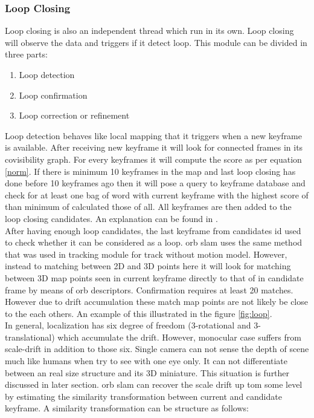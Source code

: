 \subsubsection{Loop Closing} 
Loop closing is also an independent thread which run in its own. Loop closing will observe the data and triggers if it detect loop. This module can be divided in three parts:
\begin{enumerate}
	\item Loop detection
	\item Loop confirmation
	\item Loop correction or refinement
\end{enumerate}
Loop detection behaves like local mapping that it triggers when a new keyframe is available. After receiving new keyframe it will look for connected frames in its covisibility graph.
For every keyframes it will compute the score as per equation \ref{norm}. If there is minimum 10 keyframes in the map and last loop closing has done before 10 keyframes ago then it will pose a query to keyframe database and check for at least one bag of word with current keyframe with the highest score of than minimum of calculated those of all. All keyframes are then added to the loop closing candidates. An explanation can be found in \cite{chris}.\\
\newline
After having enough loop candidates, the last keyframe from candidates id used to check whether it can be considered as a loop. \acrshort{orb} \acrshort{slam} uses the same method that was used in tracking module for track without motion model. However, instead to matching between 2D and 3D points here it will look for matching between 3D map points seen in current keyframe directly to that of in candidate frame by means of \acrshort{orb} descriptors. Confirmation requires at least 20 matches. However due to drift accumulation these match map points are not likely be close to the each others. An example of this illustrated in the figure \ref{fig:loop}.\\
\newline In general, localization has six degree of freedom (3-rotational and 3-translational) which accumulate the drift. However, monocular case suffers from scale-drift in addition to those six. Single camera can not sense the depth of scene much like humans when try to see with one eye only. It can not differentiate between an real size structure and its 3D miniature.
This situation is further discussed in later section. \acrshort{orb} \acrshort{slam} can recover the scale drift up tom some level by estimating the similarity transformation between current and candidate keyframe. A similarity transformation can be structure as follows:
